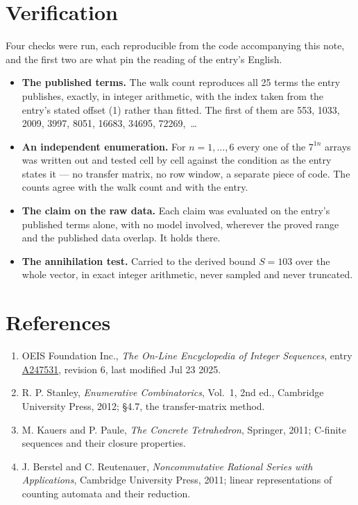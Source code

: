 \documentclass[11pt]{article}
\theoremstyle{definition}
\begin{document}
\section{Verification}

Four checks were run, each reproducible from the code accompanying this note, and the first two are what pin the reading of the entry's English.

\begin{itemize}

\item {\bfseries The published terms.} The walk count reproduces all 25 terms the entry publishes, exactly, in integer arithmetic, with the index taken from the entry's stated offset (1) rather than fitted. The first of them are 553, 1033, 2009, 3997, 8051, 16683, 34695, 72269,~\dots

\item {\bfseries An independent enumeration.} For $n = 1,\dots,6$ every one of the $7^{1n}$ arrays was written out and tested cell by cell against the condition as the entry states it --- no transfer matrix, no row window, a separate piece of code. The counts agree with the walk count and with the entry.

\item {\bfseries The claim on the raw data.} Each claim was evaluated on the entry's published terms alone, with no model involved, wherever the proved range and the published data overlap. It holds there.

\item {\bfseries The annihilation test.} Carried to the derived bound $S = 103$ over the whole vector, in exact integer arithmetic, never sampled and never truncated.

\end{itemize}

\section{References}

\begin{enumerate}

\item OEIS Foundation Inc., \emph{The On-Line Encyclopedia of Integer Sequences}, entry \href{https://oeis.org/A247531}{A247531}, revision 6, last modified Jul 23 2025.

\item R. P. Stanley, \emph{Enumerative Combinatorics}, Vol.~1, 2nd ed., Cambridge University Press, 2012; \S4.7, the transfer-matrix method.

\item M. Kauers and P. Paule, \emph{The Concrete Tetrahedron}, Springer, 2011; C-finite sequences and their closure properties.

\item J. Berstel and C. Reutenauer, \emph{Noncommutative Rational Series with Applications}, Cambridge University Press, 2011; linear representations of counting automata and their reduction.

\end{enumerate}
\end{document}
